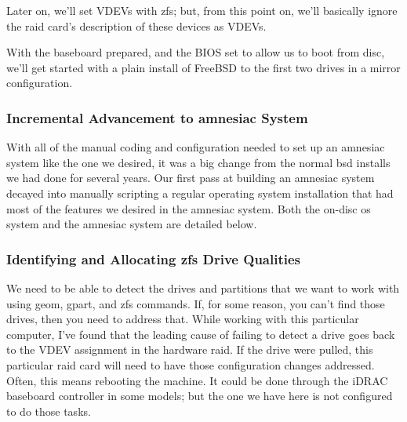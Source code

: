 Later on, we'll set VDEVs with  \gls{zfs}; but, from this point on, we'll basically ignore the  \gls{raid} card's description of these devices as VDEVs.

With the baseboard prepared, and the BIOS set to allow us to boot from disc, we'll get started with a plain install of FreeBSD to the first two drives in a \Gls{mirror} \gls{configuration}.

\subsubsection{Incremental Advancement to \Gls{amnesiac} System}
With all of the manual  \gls{coding} and \gls{configuration} needed to set up an \gls{amnesiac} system like the one we desired, it was a big change from the normal \gls{bsd} installs we had done for several years.  Our first pass at building an \gls{amnesiac} system decayed into manually scripting a regular  \gls{operating system} installation that had most of the features we desired in the \gls{amnesiac} system.  Both the on-disc \gls{os} system and the \gls{amnesiac} system are detailed below.

\subsubsection{Identifying and Allocating \gls{zfs} Drive Qualities}
\label{sec:zfs-config}
We need to be able to detect the drives and partitions that we want to work with using geom, gpart, and \gls{zfs} commands.  If, for some reason, you can't find those drives, then you need to address that.  While working with this particular computer, I've found that the leading cause of failing to detect a drive goes back to the VDEV assignment in the hardware  \gls{raid}.  If the drive were pulled, this particular  \gls{raid} card will need to have those \gls{configuration} changes addressed.  Often, this means rebooting the machine.  It could be done through the iDRAC baseboard controller in some models; but the one we have here is not configured to do those tasks.

